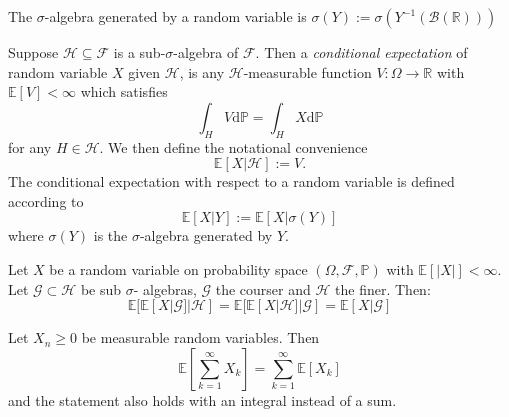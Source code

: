 \begin{definition}
    The $\sigma$-algebra generated by a random variable is
    $\sigma(Y):=\sigma(Y^{-1}(\mathcal{B}(\mathbb{R})))$
\end{definition}

\begin{definition}
    Suppose $\mathcal{H}\subseteq\mathcal{F}$ is a sub-$\sigma$-algebra
    of $\mathcal{F}.$ Then a \emph{conditional expectation} of random variable
    $X$ given $\mathcal{H}$, is any $\mathcal{H}$-measurable function 
    $V:\Omega\rightarrow\mathbb{R}$ with $\mathbb{E}[V]<\infty$ which satisfies
    \begin{equation}
        \int_H V\mathrm d\mathbb{P}=\int_H X\mathrm d\mathbb{P}
    \end{equation}
    for any $H\in\mathcal{H}$. We then define the notational convenience
    \begin{equation}
        \mathbb{E}[X|\mathcal{H}]:=V.
    \end{equation}
    The conditional expectation with respect to a random variable is defined according
    to
    \begin{equation}
        \mathbb{E}[X|Y]:=\mathbb{E}[X|\sigma(Y)]
    \end{equation}
    where $\sigma(Y)$ is the $\sigma$-algebra generated by $Y$.
\end{definition}

\begin{theorem}
    Let $X$ be a random variable on probability space $(\Omega,\mathcal{F},\mathbb{P})$
    with $\mathbb{E}[|X|]<\infty$. Let $\mathcal{G}\subset\mathcal{H}$ be sub $\sigma$-
    algebras, $\mathcal{G}$ the courser and $\mathcal{H}$ the finer. Then:
    \begin{equation}
        \mathbb{E}[\mathbb{E}[X|\mathcal{G}]|\mathcal{H}]=\mathbb{E}[\mathbb{E}[X|\mathcal{H}]|\mathcal{G}]=\mathbb{E}[X|\mathcal{G}]
    \end{equation}
\end{theorem}

\begin{theorem}[Tonelli]
    Let $X_n\geq0$ be measurable random variables. Then 
    \begin{equation}\label{eq:1.11}
        \mathbb{E}\left[\sum_{k=1}^\infty X_k\right]=\sum_{k=1}^\infty\mathbb{E}[X_k]
    \end{equation}
    and the statement also holds with an integral instead of a sum.
\end{theorem}

